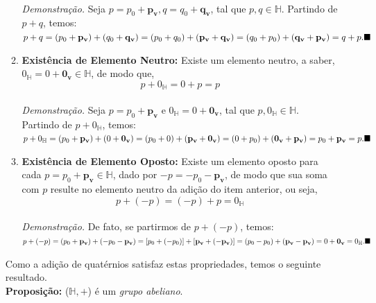 \documentclass[a4paper,12pt]{report}
\theoremstyle{plain}
\theoremstyle{definition}
\begin{document}
\begin{itemize}
\begin{enumerate}
		\\ \newline \textit{Demonstração.} Seja $p=p_0+\mathbf{p_v}, q=q_0+\mathbf{q_v}$,\,\,tal que $p,q \in \mathbb{H}$. Partindo de $p+q$, temos:
		\\ \newline $p+q=(p_0+\mathbf{p_v})+(q_0+\mathbf{q_v})=(p_0+q_0)+(\mathbf{p_v}+\mathbf{q_v})=(q_0+p_0)+(\mathbf{q_v}+\mathbf{p_v})=q+p.\hfill\blacksquare$
		\\ \item \textbf{Existência de Elemento Neutro:} Existe um elemento neutro, a saber, $0_{\mathbb{H}}=0+\mathbf{0_v} \in \mathbb{H}$, de modo que,
		\begin{equation}
			p+0_{\mathbb{H}}=0+p=p
		\end{equation}
		\\ \textit{Demonstração.}  Seja $p=p_0+\mathbf{p_v} \textrm{ e } 0_{\mathbb{H}}=0+\mathbf{0_v}$,\,\,tal que $p,0_{\mathbb{H}} \in \mathbb{H}$. Partindo de $p+0_{\mathbb{H}}$, temos:
		\\ \newline $p+0_{\mathbb{H}}=(p_0+\mathbf{p_v})+(0+\mathbf{0_v})=(p_0+0)+(\mathbf{p_v}+\mathbf{0_v})=(0+p_0)+(\mathbf{0_v}+\mathbf{p_v})=p_0+\mathbf{p_v}=p.\hfill\blacksquare$
		\\ \item \textbf{Existência de Elemento Oposto:} Existe um elemento oposto para cada $p=p_0+\mathbf{p_v} \in \mathbb{H}$, dado por $-p=-p_0-\mathbf{p_v}$, de modo que sua soma com $p$ resulte no elemento neutro da adição do item anterior, ou seja,
		\begin{equation}
			p+(-p)=(-p)+p=0_{\mathbb{H}}
		\end{equation}
		\\ \textit{Demonstração.} De fato, se partirmos de $p+(-p)$, temos:
		\\ \newline $p+(-p)= (p_0+\mathbf{p_v})+(-p_0-\mathbf{p_v})=[p_0+(-p_0)]+[\mathbf{p_v}+(\mathbf{-p_v})]=(p_0-p_0)+(\mathbf{p_v}-\mathbf{p_v})=0+\mathbf{0_v}=0_{\mathbb{H}}.\hfill\blacksquare$
	\end{enumerate}
	Como a adição de quatérnios satisfaz estas propriedades, temos o seguinte resultado.
	\\ \newline \textbf{Proposição: } ($\mathbb{H},+$) é um \textit{grupo abeliano}.
	\\
	

\end{itemize}
\end{document}
